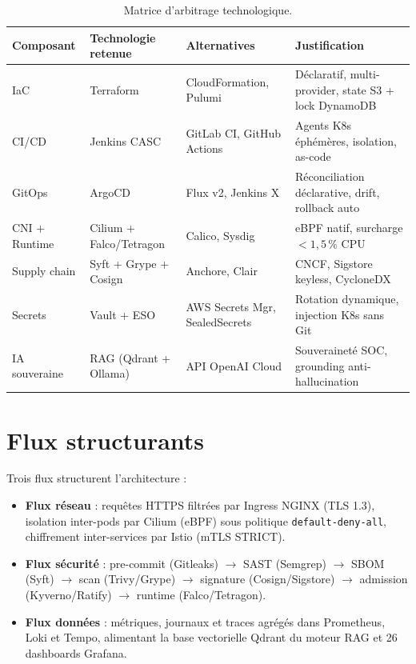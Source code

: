 \documentclass[12pt,a4paper,openany]{report}
\begin{document}
\begin{table}[h]
\centering
\scriptsize
\begin{tabular}{@{}p{2.6cm}p{3.2cm}p{3.2cm}p{4.4cm}@{}}
\toprule
\textbf{Composant} & \textbf{Technologie retenue} & \textbf{Alternatives} & \textbf{Justification} \\
\midrule
IaC & Terraform & CloudFormation, Pulumi & Déclaratif, multi-provider, state S3 + lock DynamoDB \\
CI/CD & Jenkins CASC & GitLab CI, GitHub Actions & Agents K8s éphémères, isolation, as-code \\
GitOps & ArgoCD & Flux v2, Jenkins X & Réconciliation déclarative, drift, rollback auto \\
CNI + Runtime & Cilium + Falco/Tetragon & Calico, Sysdig & eBPF natif, surcharge $<1{,}5\,\%$ CPU \\
Supply chain & Syft + Grype + Cosign & Anchore, Clair & CNCF, Sigstore keyless, CycloneDX \\
Secrets & Vault + ESO & AWS Secrets Mgr, SealedSecrets & Rotation dynamique, injection K8s sans Git \\
IA souveraine & RAG (Qdrant + Ollama) & API OpenAI Cloud & Souveraineté SOC, grounding anti-hallucination \\
\bottomrule
\end{tabular}
\caption{Matrice d'arbitrage technologique.}
\label{tab:arbitrage}
\end{table}

\section{Flux structurants}

Trois flux structurent l'architecture :
\begin{itemize}
  \item \textbf{Flux réseau} : requêtes HTTPS filtrées par Ingress NGINX (TLS 1.3),
  isolation inter-pods par Cilium (eBPF) sous politique \texttt{default-deny-all},
  chiffrement inter-services par Istio (mTLS STRICT).
  \item \textbf{Flux sécurité} : pre-commit (Gitleaks) $\rightarrow$ SAST (Semgrep)
  $\rightarrow$ SBOM (Syft) $\rightarrow$ scan (Trivy/Grype) $\rightarrow$ signature
  (Cosign/Sigstore) $\rightarrow$ admission (Kyverno/Ratify) $\rightarrow$ runtime (Falco/Tetragon).
  \item \textbf{Flux données} : métriques, journaux et traces agrégés dans Prometheus, Loki
  et Tempo, alimentant la base vectorielle Qdrant du moteur RAG et 26 dashboards Grafana.
\end{itemize}
\end{document}
